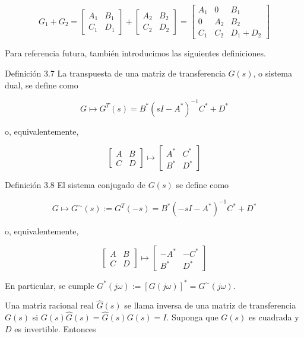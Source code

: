 \documentclass[11pt]{article}
\begin{document}
$$
G_{1}+G_{2}=\left[\begin{array}{c|c}
A_{1} & B_{1} \\
\hline C_{1} & D_{1}
\end{array}\right]+\left[\begin{array}{c|c}
A_{2} & B_{2} \\
\hline C_{2} & D_{2}
\end{array}\right]=\left[\begin{array}{cc|c}
A_{1} & 0 & B_{1} \\
0 & A_{2} & B_{2} \\
\hline C_{1} & C_{2} & D_{1}+D_{2}
\end{array}\right]
$$

Para referencia futura, también introducimos las siguientes definiciones.

Definición 3.7 La transpuesta de una matriz de transferencia $G(s)$, o sistema dual, se define como

$$
G \longmapsto G^{T}(s)=B^{*}\left(s I-A^{*}\right)^{-1} C^{*}+D^{*}
$$

o, equivalentemente,

$$
\left[\begin{array}{c|c}
A & B \\
\hline C & D
\end{array}\right] \longmapsto\left[\begin{array}{c|c}
A^{*} & C^{*} \\
\hline B^{*} & D^{*}
\end{array}\right]
$$

Definición 3.8 El sistema conjugado de $G(s)$ se define como

$$
G \longmapsto G^{\sim}(s):=G^{T}(-s)=B^{*}\left(-s I-A^{*}\right)^{-1} C^{*}+D^{*}
$$

o, equivalentemente,

$$
\left[\begin{array}{c|c}
A & B \\
\hline C & D
\end{array}\right] \longmapsto\left[\begin{array}{c|c}
-A^{*} & -C^{*} \\
\hline B^{*} & D^{*}
\end{array}\right]
$$

En particular, se cumple $G^{*}(j \omega):=[G(j \omega)]^{*}=G^{\sim}(j \omega)$.

Una matriz racional real $\hat{G}(s)$ se llama inversa de una matriz de transferencia $G(s)$ si $G(s) \hat{G}(s)=\hat{G}(s) G(s)=I$. Suponga que $G(s)$ es cuadrada y $D$ es invertible. Entonces
\end{document}
